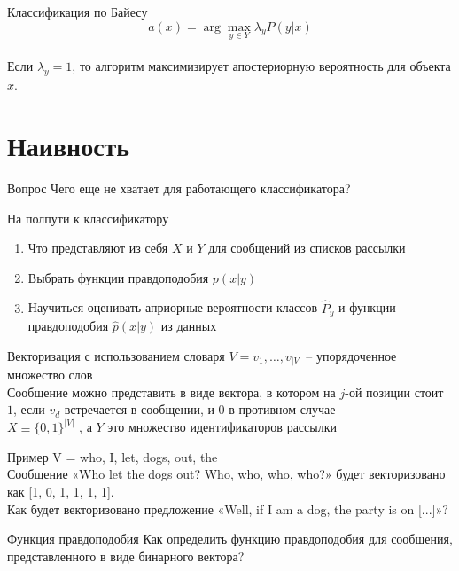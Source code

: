 \documentclass[10pt]{beamer}
\begin{document}
\begin{frame}{Классификация по Байесу}
  $$a(x) = \arg\max\limits_{y \in Y} \lambda_y P(y|x)$$\\
  \bigbreak
  Если $\lambda_y = 1$, то алгоритм максимизирует апостериорную вероятность для объекта $x$.
\end{frame}

\section{Наивность}

\begin{frame}{Вопрос}
  \centering
  Чего еще не хватает для \alert{работающего} классификатора?
\end{frame}

\begin{frame} {На полпути к классификатору}
  \begin{enumerate} [<+->]
    \item Что представляют из себя $X$ и $Y$ для сообщений из списков рассылки
    \item Выбрать функции правдоподобия $p(x|y)$
    \item Научиться оценивать априорные вероятности классов $\hat{P}_y$ и функции правдоподобия $\hat{p}(x|y)$ из данных
  \end{enumerate}
\end{frame}

\begin{frame}{Векторизация с использованием словаря}
  $V = {v_1, \dots, v_{|V|}}$ -- упорядоченное множество слов\\
  \bigbreak
  Сообщение можно представить в виде вектора, в котором на $j$-ой позиции стоит $1$, если $v_d$ встречается в сообщении, и $0$ в противном случае\\
  \bigbreak
  $X\equiv \{0, 1\}^{|V|}$ , а $Y$ это множество идентификаторов рассылки
\end{frame}

\begin{frame}{Пример}
  V = {who, I, let, dogs, out, the}\\
  \pause
  \bigbreak
  Сообщение «Who let the dogs out? Who, who, who, who?» будет векторизовано как [1, 0, 1, 1, 1, 1].\\
  \pause
  \bigbreak
  Как будет векторизовано предложение «Well, if I am a dog, the party is on [...]»?
\end{frame}

\begin{frame}{Функция правдоподобия}
  \centering 
  Как определить функцию правдоподобия для сообщения, представленного в виде бинарного вектора?
\end{frame}
\end{document}
